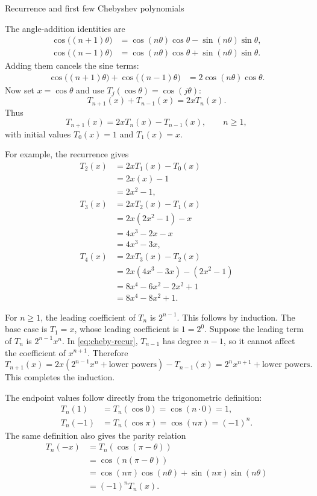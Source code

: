 \documentclass[11pt]{beamer}
\begin{document}
\begin{frame}[allowframebreaks]{Recurrence and first few Chebyshev polynomials}
\footnotesize

The angle-addition identities are
\begin{align*}
  \cos\bigl((n+1)\theta\bigr)
    &=\cos(n\theta)\cos\theta-\sin(n\theta)\sin\theta,\\
  \cos\bigl((n-1)\theta\bigr)
    &=\cos(n\theta)\cos\theta+\sin(n\theta)\sin\theta.
\end{align*}
Adding them cancels the sine terms:
\begin{align*}
  \cos\bigl((n+1)\theta\bigr)
   +\cos\bigl((n-1)\theta\bigr)
    &=2\cos(n\theta)\cos\theta.
\end{align*}
Now set $x=\cos\theta$ and use
$T_j(\cos\theta)=\cos(j\theta)$:
\[
  T_{n+1}(x)+T_{n-1}(x)=2xT_n(x).
\]
Thus
\begin{equation}
  T_{n+1}(x)=2xT_n(x)-T_{n-1}(x),
  \qquad n\ge1,
  \label{eq:cheby-recur}
\end{equation}
with initial values $T_0(x)=1$ and $T_1(x)=x$.

For example, the recurrence gives
\begin{align*}
  T_2(x)
   &=2xT_1(x)-T_0(x)\\
   &=2x(x)-1\\
   &=2x^2-1,\\[0.4em]
  T_3(x)
   &=2xT_2(x)-T_1(x)\\
   &=2x(2x^2-1)-x\\
   &=4x^3-2x-x\\
   &=4x^3-3x,\\[0.4em]
  T_4(x)
   &=2xT_3(x)-T_2(x)\\
   &=2x(4x^3-3x)-(2x^2-1)\\
   &=8x^4-6x^2-2x^2+1\\
   &=8x^4-8x^2+1.
\end{align*}

For $n\ge1$, the leading coefficient of $T_n$ is $2^{n-1}$.  This follows by
induction.  The base case is $T_1=x$, whose leading coefficient is
$1=2^0$.  Suppose the leading term of $T_n$ is $2^{n-1}x^n$.  In
\eqref{eq:cheby-recur}, $T_{n-1}$ has degree $n-1$, so it cannot affect the
coefficient of $x^{n+1}$.  Therefore
\[
  T_{n+1}(x)
    =2x\left(2^{n-1}x^n+\text{lower powers}\right)
      -T_{n-1}(x)
    =2^n x^{n+1}+\text{lower powers}.
\]
This completes the induction.

The endpoint values follow directly from the trigonometric definition:
\begin{align*}
  T_n(1)
    &=T_n(\cos0)
      =\cos(n\cdot0)
      =1,\\
  T_n(-1)
    &=T_n(\cos\pi)
      =\cos(n\pi)
      =(-1)^n.
\end{align*}
The same definition also gives the parity relation
\begin{align*}
  T_n(-x)
    &=T_n\!\left(\cos(\pi-\theta)\right)\\
    &=\cos\!\left(n(\pi-\theta)\right)\\
    &=\cos(n\pi)\cos(n\theta)+\sin(n\pi)\sin(n\theta)\\
    &=(-1)^nT_n(x).
\end{align*}
\end{frame}
\end{document}
